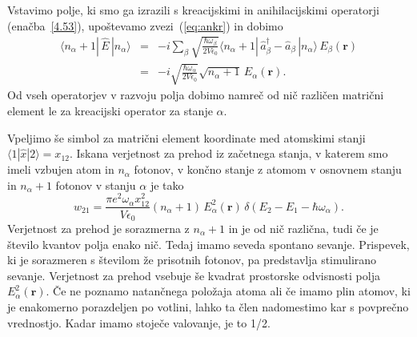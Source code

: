 Vstavimo polje, ki smo ga izrazili s kreacijskimi in anihilacijskimi operatorji (enačba~\ref{4.53}),
upoštevamo zvezi~(\ref{eq:ankr}) in dobimo
\begin{eqnarray}
\langle n_{\alpha}+1|\, \hat{E}\,|n_{\alpha}\rangle & = 
& -i\sum_{\beta}\sqrt{\frac{\hbar\omega_{\beta}}{2V\epsilon_{0}}}
\langle n_{\alpha}+1|\,\hat{a}_{\beta}^{\dagger}-\hat{a}_{\beta}\,|n_{\alpha}\rangle\, 
E_{\beta}(\mathbf{r})\nonumber \\
 & = & -i\sqrt{\frac{\hbar\omega_{\alpha}}{2V\epsilon_{0}}}
 \sqrt{n_{\alpha}+1}\, E_{\alpha}(\mathbf{r}).
\end{eqnarray}
Od vseh operatorjev v razvoju polja dobimo namreč od nič različen matrični
element le za kreacijski operator za stanje $\alpha$.

Vpeljimo še simbol za matrični element koordinate med 
atomskimi stanji $\langle1|\hat{x}|2\rangle=x_{12}$. Iskana verjetnost za prehod iz 
začetnega stanja, v katerem smo imeli vzbujen atom in $n_{\alpha}$ fotonov, v končno
stanje z atomom v osnovnem stanju in $n_{\alpha}+1$ fotonov v stanju $\alpha$ je tako
\begin{equation}
w_{21}=\frac{\pi e^{2}\omega_{\alpha}x_{12}^{2}}{V\epsilon_{0}}
(n_{\alpha}+1)\,E_{\alpha}^{2}(\mathbf{r})\,\delta(E_{2}-E_{1}-\hbar\omega_{\alpha}).
\label{4.56}
\end{equation}
Verjetnost za prehod je sorazmerna z $n_{\alpha}+1$ in je od nič
različna, tudi če je število kvantov polja enako nič. Tedaj imamo seveda
spontano sevanje. Prispevek, ki je 
sorazmeren s številom že prisotnih fotonov, pa predstavlja stimulirano 
sevanje. Verjetnost za prehod vsebuje
še kvadrat prostorske odvisnosti polja $E_{\alpha}^{2}(\mathbf{r})$.
Če ne poznamo natančnega položaja atoma ali če imamo plin atomov, ki je enakomerno
porazdeljen po votlini, lahko ta člen nadomestimo kar s povprečno vrednostjo.
Kadar imamo stoječe valovanje, je to 1/2.

